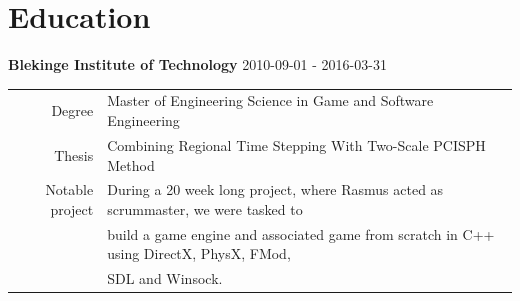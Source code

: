 \documentclass[a4paper, 11pt]{article}
\begin{document}
\section{Education}
\textbf{Blekinge Institute of Technology} 2010-09-01 - 2016-03-31 \\
\begin{tabular}{rl}
Degree&  Master of Engineering Science in Game and Software Engineering\\
Thesis& Combining Regional Time Stepping With Two-Scale PCISPH Method\\
Notable project& During a 20 week long project, where Rasmus acted  as scrummaster, we were tasked to\\& build a game engine and associated game from scratch in C++ using DirectX, PhysX, FMod,\\& SDL and Winsock.
\end{tabular}
\end{document}
